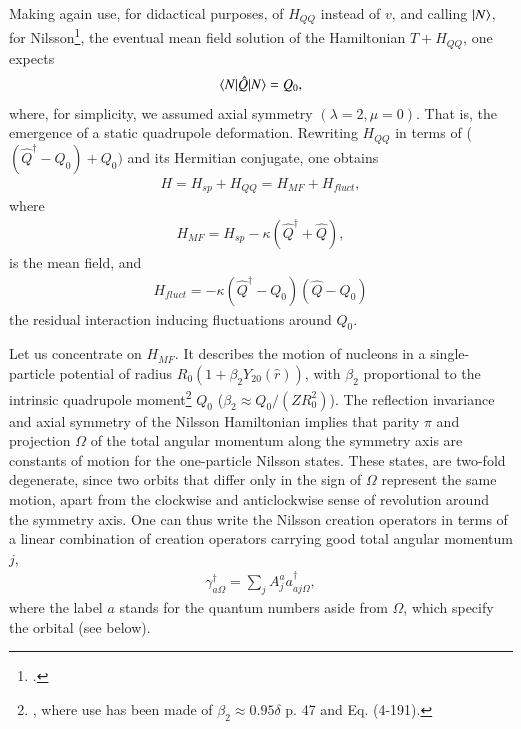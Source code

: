 Making again use, for didactical purposes, of $H_{QQ}$ instead of $v$, and calling $|{N} \rangle$, for Nilsson\footnote{\cite{Nilsson:55}.}, the eventual mean field solution of the Hamiltonian $T+H_{QQ}$, one expects
  \begin{align}\label{eq0.4.1}
\langle {N|\hat Q|N} \rangle=Q_0,
  \end{align}
where, for simplicity, we assumed axial symmetry $(\lambda=2,\mu=0)$. That is, the emergence of a static quadrupole deformation.
Rewriting $H_{QQ}$ in terms of ($(\hat Q^\dagger-Q_0)+Q_0)$ and its Hermitian conjugate, one obtains 
  \begin{align}\label{eq0.4.2}
H=H_{sp}+H_{QQ}=H_{MF}+H_{fluct},
\end{align}
where 
  \begin{align}\label{eq0.4.3}
H_{MF}=H_{sp}-\kappa(\hat Q^\dagger+\hat Q),
\end{align}
is the mean field, and
\begin{align}\label{eq0.4.4}
H_{fluct}=-\kappa(\hat Q^\dagger-Q_0)(\hat Q-Q_0)
\end{align}
the residual interaction inducing fluctuations around $Q_0$.


 Let us  concentrate on $H_{MF}$. It describes the motion of nucleons in a single-particle potential of radius $R_0(1+\beta_2Y_{20}(\hat r))$, with $\beta_2$ proportional to the intrinsic quadrupole moment\footnote{\cite{Mottelson:59}, where use has been made of $\beta_2\approx0.95\delta$ \cite{Bohr:75} p. 47 and Eq. (4-191).} $Q_0$ ($\beta_2\approx Q_0/(ZR_0^2)$). The reflection invariance and axial symmetry of the Nilsson Hamiltonian implies that parity $\pi$ and projection $\Omega$ of the total angular momentum along the symmetry axis are constants of motion for the one-particle Nilsson states. These states, are two-fold degenerate, since two orbits that differ only in the sign of $\Omega$ represent the same motion, apart from the clockwise and anticlockwise sense of revolution around the symmetry axis. One can thus write the Nilsson creation operators in terms of a linear combination of creation operators carrying good total angular momentum $j$, 
\begin{align}\label{eq0.4.5}
\gamma^\dagger_{a\Omega}=\sum_jA_j^aa^\dagger_{aj\Omega},
\end{align}
where the label $a$ stands for  the quantum numbers aside from $\Omega$, which specify the orbital (see below). 

